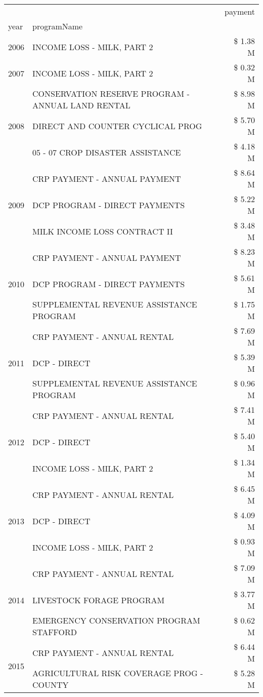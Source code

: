 \begin{tabular}{llr}
\toprule
 &  & payment \\
year & programName &  \\
\midrule
2006 & INCOME LOSS - MILK, PART 2 & \$ 1.38 M \\
\cline{1-3}
2007 & INCOME LOSS - MILK, PART 2 & \$ 0.32 M \\
\cline{1-3}
\multirow[t]{3}{*}{2008} & CONSERVATION RESERVE PROGRAM - ANNUAL LAND RENTAL & \$ 8.98 M \\
 & DIRECT AND COUNTER CYCLICAL PROG & \$ 5.70 M \\
 & 05 - 07 CROP DISASTER ASSISTANCE & \$ 4.18 M \\
\cline{1-3}
\multirow[t]{3}{*}{2009} & CRP PAYMENT - ANNUAL PAYMENT & \$ 8.64 M \\
 & DCP PROGRAM - DIRECT PAYMENTS & \$ 5.22 M \\
 & MILK INCOME LOSS CONTRACT II & \$ 3.48 M \\
\cline{1-3}
\multirow[t]{3}{*}{2010} & CRP PAYMENT - ANNUAL PAYMENT & \$ 8.23 M \\
 & DCP PROGRAM - DIRECT PAYMENTS & \$ 5.61 M \\
 & SUPPLEMENTAL REVENUE ASSISTANCE PROGRAM & \$ 1.75 M \\
\cline{1-3}
\multirow[t]{3}{*}{2011} & CRP PAYMENT - ANNUAL RENTAL & \$ 7.69 M \\
 & DCP - DIRECT & \$ 5.39 M \\
 & SUPPLEMENTAL REVENUE ASSISTANCE PROGRAM & \$ 0.96 M \\
\cline{1-3}
\multirow[t]{3}{*}{2012} & CRP PAYMENT - ANNUAL RENTAL & \$ 7.41 M \\
 & DCP - DIRECT & \$ 5.40 M \\
 & INCOME LOSS - MILK, PART 2 & \$ 1.34 M \\
\cline{1-3}
\multirow[t]{3}{*}{2013} & CRP PAYMENT - ANNUAL RENTAL & \$ 6.45 M \\
 & DCP - DIRECT & \$ 4.09 M \\
 & INCOME LOSS - MILK, PART 2 & \$ 0.93 M \\
\cline{1-3}
\multirow[t]{3}{*}{2014} & CRP PAYMENT - ANNUAL RENTAL & \$ 7.09 M \\
 & LIVESTOCK FORAGE PROGRAM & \$ 3.77 M \\
 & EMERGENCY CONSERVATION PROGRAM STAFFORD & \$ 0.62 M \\
\cline{1-3}
\multirow[t]{3}{*}{2015} & CRP PAYMENT - ANNUAL RENTAL & \$ 6.44 M \\
 & AGRICULTURAL RISK COVERAGE PROG - COUNTY & \$ 5.28 M \\

\end{tabular}
